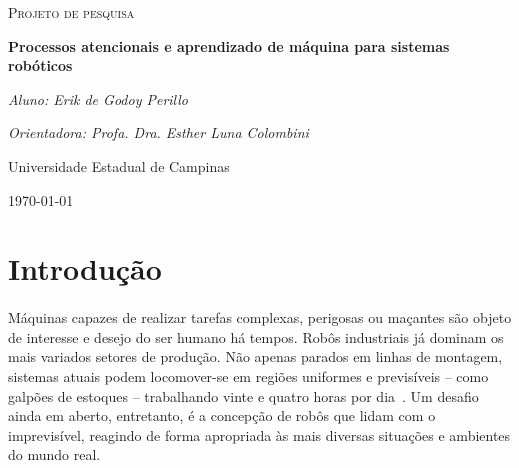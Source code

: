 \documentclass[11pt]{article}
\begin{document}
\begin{titlepage}
	\centering
	{\scshape\Large Projeto de pesquisa\par}
	\vspace{1.5cm}
	{\huge\bfseries Processos atencionais e aprendizado de máquina 
		para sistemas robóticos\par}
	\vspace{1cm}
	{\itshape Aluno: Erik de Godoy Perillo\par}
	{\itshape Orientadora: Profa. Dra. Esther Luna Colombini\par}
	\vspace{0.5cm}
	\begin{abstract}
		Entender o ambiente ao seu redor é uma tarefa fundamental para 
		o desafio de se obter máquinas autônomas que interagem com o 
		mundo de forma semelhante à nossa.
		No entanto, a alta dimensionalidade dos dados captados por sensores 
		usados para este fim é em geral problemática, muitas vezes havendo
		redundância e irrelevância de informação. 
		Nos seres humanos este filtro sensorial é realizado pela Atenção.
		Neste contexto, este projeto propõe a aplicação de técnicas de 
		aprendizado de máquina sobre informações sensoriais previamente 
		processadas por processos atencionais em uma tarefa de navegação 
		autônoma.  
		Adicionalmente, planeja-se implementar uma estrutura que permita o 
		uso das técnicas propostas para projetos robóticos em geral que 
		utilizem GPUs embarcadas.
	\end{abstract}
	\vfill
	Universidade Estadual de Campinas 
	\vfill
	{\large \today\par}
\end{titlepage}

\newpage

\section{Introdução}
\paragraph{}
Máquinas capazes de realizar tarefas complexas, perigosas ou maçantes são
objeto de interesse e desejo do ser humano há tempos. 
Robôs industriais já dominam os mais variados setores de produção. 
Não apenas parados em linhas de montagem, sistemas atuais podem locomover-se
em regiões uniformes e previsíveis -- como galpões de estoques -- trabalhando
vinte e quatro horas por dia~\cite{warehouse}.
Um desafio ainda em aberto, entretanto, é a concepção de robôs que lidam com 
o imprevisível, reagindo de forma apropriada às mais diversas situações 
e ambientes do mundo real. 
\end{document}
